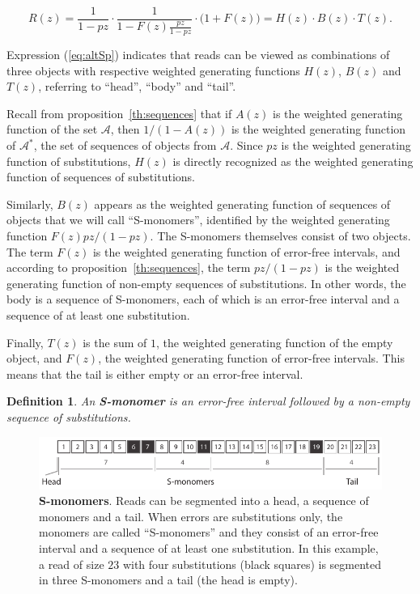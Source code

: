 \documentclass{article}
\newtheorem{definition}{Definition}
\begin{document}
\begin{equation}
\label{eq:altSp}
R(z) = \frac{1}{1-pz} \cdot \frac{1}{1-F(z)\frac{pz}{1-pz}} \cdot
\big(1+F(z)\big) = H(z) \cdot B(z) \cdot T(z).
\end{equation}

Expression (\ref{eq:altSp}) indicates that reads can be viewed as
combinations of three objects with respective weighted generating
functions $H(z)$, $B(z)$ and $T(z)$, referring to ``head'', ``body'' and
``tail''.

Recall from proposition~\ref{th:sequences} that if $A(z)$ is the weighted
generating function of the set $\mathcal{A}$, then $1/(1-A(z))$ is the
weighted generating function of $\mathcal{A}^*$, the set of sequences of
objects from $\mathcal{A}$. Since $pz$ is the weighted generating function
of substitutions, $H(z)$ is directly recognized as the weighted generating
function of sequences of substitutions.

Similarly, $B(z)$ appears as the weighted generating function of sequences
of objects that we will call ``S-monomers'', identified by the weighted
generating function $F(z)pz/(1-pz)$. The S-monomers themselves consist
of two objects. The term $F(z)$ is the weighted generating function of
error-free intervals, and according to proposition~\ref{th:sequences}, the
term $pz/(1-pz)$ is the weighted generating function of non-empty
sequences of substitutions. In other words, the body is a sequence of
S-monomers, each of which is an error-free interval and a sequence of at
least one substitution.

Finally, $T(z)$ is the sum of $1$, the weighted generating function of the
empty object, and $F(z)$, the weighted generating function of error-free
intervals. This means that the tail is either empty or an error-free
interval.


\begin{definition}
An \textbf{S-monomer} is an error-free interval followed by a
non-empty sequence of substitutions.
\end{definition}

\begin{figure}[h]
\centering
\includegraphics[scale=0.95]{sketch_S_monomers.pdf}
\caption{\textbf{S-monomers}. Reads can be segmented into a head, a
sequence of monomers and a tail. When errors are substitutions only, the
monomers are called ``S-monomers'' and they consist of an error-free
interval and a sequence of at least one substitution. In this example, a
read of size $23$ with four substitutions (black squares) is segmented in
three S-monomers and a tail (the head is empty).}
\label{fig:sketchsubint}
\end{figure}
\end{document}

